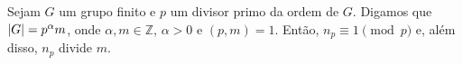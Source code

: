 \begin{theorem}[Sylow]\label{thm:terceiro-teorema-de-sylow}
  Sejam $G$ um grupo finito e $p$ um divisor primo da ordem de $G$. Digamos que $\lvert G\rvert=p^{\alpha}m$, onde $\alpha,m\in{\mathbb{Z}}$, $\alpha>0$ e $(p,m)=1$. Então, $n_{p}\equiv{1}\pmod{p}$ e, além disso, $n_{p}$ divide $m$.
\end{theorem}
